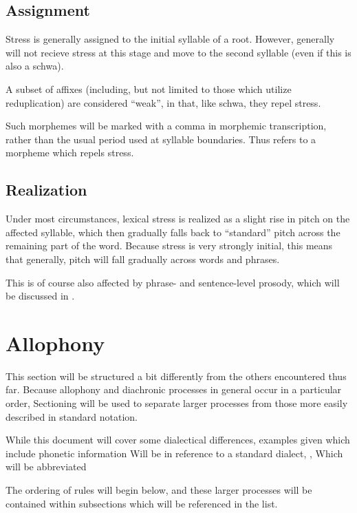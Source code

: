 \subsection{Assignment}\label{sec:phono-stress-assign}
Stress is generally assigned to the initial syllable of a root. However,  generally will not recieve stress at this stage and move to the second syllable (even if this is also a schwa).

A subset of affixes (including, but not limited to those which utilize reduplication) are considered ``weak'', in that, like schwa, they repel stress.

Such morphemes will be marked with a comma in morphemic transcription, rather than the usual period used at syllable boundaries. Thus  refers to a morpheme  which repels stress.

\subsection{Realization}
Under most circumstances, lexical stress is realized as a slight rise in pitch on the affected syllable, which then gradually falls back to ``standard'' pitch across the remaining part of the word. Because stress is very strongly initial, this means that generally, pitch will fall gradually across words and phrases.

This is of course also affected by phrase- and sentence-level prosody, which will be discussed in .

\section{Allophony}\label{sec:phono-allo}
This section will be structured a bit differently from the others encountered thus far. Because allophony and diachronic processes in general occur in a particular order, Sectioning will be used to separate larger processes from those more easily described in standard notation.

While this document will cover some dialectical differences, examples given which include phonetic information Will be in reference to a standard dialect, , Which will be abbreviated 

The ordering of rules will begin below, and these larger processes will be contained within subsections which will be referenced in the list.

